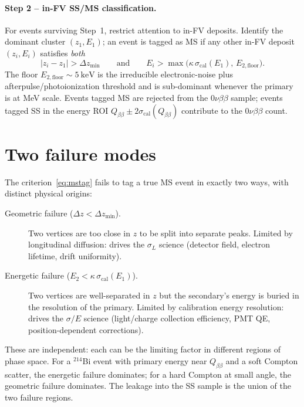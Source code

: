 \documentclass[11pt,a4paper]{article}
\begin{document}
\paragraph{Step 2 -- in-FV SS/MS classification.}
For events surviving Step~1, restrict attention to in-FV deposits.
Identify the dominant cluster $(z_1, E_1)$; an event is tagged as MS
if any other in-FV deposit $(z_i, E_i)$ satisfies \emph{both}
\begin{equation}
    |z_i - z_1| > \Delta z_{\min}
    \qquad\text{and}\qquad
    E_i > \max\bigl(\kappa\,\sigma_{\mathrm{cal}}(E_1),\,E_{2,\mathrm{floor}}\bigr).
    \label{eq:mstag}
\end{equation}
The floor $E_{2,\mathrm{floor}} \sim \SI{5}{\keV}$ is the irreducible
electronic-noise plus afterpulse/photoionization threshold and is
sub-dominant whenever the primary is at MeV scale. Events tagged MS
are rejected from the $0\nu\beta\beta$ sample; events tagged SS in
the energy ROI $Q_{\beta\beta} \pm 2\sigma_{\mathrm{cal}}(Q_{\beta\beta})$
contribute to the $0\nu\beta\beta$ count.

\section{Two failure modes}

The criterion~\eqref{eq:mstag} fails to tag a true MS event in
exactly two ways, with distinct physical origins:

\begin{description}
\item[Geometric failure ($\Delta z < \Delta z_{\min}$).]
Two vertices are too close in $z$ to be split into separate peaks.
Limited by longitudinal diffusion: drives the $\sigma_L$ science
(detector field, electron lifetime, drift uniformity).

\item[Energetic failure ($E_2 < \kappa\,\sigma_{\mathrm{cal}}(E_1)$).]
Two vertices are well-separated in $z$ but the secondary's energy is
buried in the resolution of the primary. Limited by calibration
energy resolution: drives the $\sigma/E$ science (light/charge
collection efficiency, PMT QE, position-dependent corrections).
\end{description}

These are independent: each can be the limiting factor in different
regions of phase space. For a $^{214}$Bi event with primary energy
near $Q_{\beta\beta}$ and a soft Compton scatter, the energetic
failure dominates; for a hard Compton at small angle, the geometric
failure dominates. The leakage into the SS sample is the union of
the two failure regions.
\end{document}
